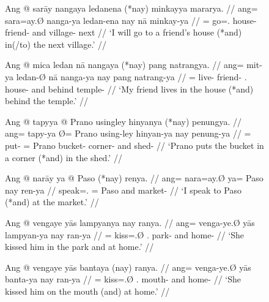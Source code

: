 \begin{figure}
\pex\label{ex:multiplace}
\a\label{ex:multiplace_1}\begingl
	\gla Ang @ sarāy nangaya ledanena \textup{(}*nay\textup{)} minkayya
		mararya. //
	\glb ang= sara=ay.Ø nanga-ya ledan-ena nay nā minkay-ya //
	\glc \AgtT{}= go=\Fsg{}.\Top{} house-\Loc{} friend-\Gen{} and
		village-\Loc{} next //
	\glft `I will go to a friend's house (*and) in(/to) the next village.' //
\endgl

\a\label{ex:multiplace_2}\begingl
	\gla Ang @ mica ledan nā nangaya \textup{(}*nay\textup{)} pang 
		natrangya. //
	\glb ang= mit-ya ledan-Ø nā nanga-ya nay pang natrang-ya //
	\glc \AgtT{}= live-\TsgM{} friend-\Top{} \Fsg{}.\Gen{} house-\Loc{} and
		behind temple-\Loc{} //
	\glft `My friend lives in the house (*and) behind the temple.' //
\endgl

\a\label{ex:multiplace_3}\begingl
	\gla Ang @ tapyya {} @ Prano usingley hinyanya \textup{(}*nay\textup{)}
		penungya. //
	\glb ang= tapy-ya Ø= Prano using-ley hinyan-ya nay penung-ya //
	\glc \AgtT{}= put-\TsgM{} \Top{}= Prano bucket-\PargI{} corner-\Loc{}
		and shed-\Loc {} //
	\glft `Prano puts the bucket in a corner (*and) in the shed.' //
\endgl

\a\label{ex:multiplace_4}\begingl
	\gla Ang @ narāy ya @ Paso \textup{(}*nay\textup{)} renya. //
	\glb ang= nara=ay.Ø ya= Paso nay ren-ya //
	\glc \AgtT{} speak=\Fsg{}.\Top{} \Loc{}= Paso and market-\Loc{} //
	\glft `I speak to Paso (*and) at the market.' //
\endgl
\xe
\end{figure}

\begin{figure}[h]
\pex\label{ex:multiplace_5}%
\a\label{ex:multiplace_5_1}%
\begingl
	\gla Ang @ vengaye yās lampyanya nay ranya. //
	\glb ang= venga-ye.Ø yās lampyan-ya nay ran-ya //
	\glc \AgtT{}= kiss=\TsgF{}.Ø \TsgM{}.\Parg{} park-\Loc{} and home-\Loc{} //
	\glft `She kissed him in the park and at home.' //
\endgl

\a\label{ex:multiplace_5_2}%
\begingl
	\gla Ang @ vengaye yās bantaya \textup{(\excl{}}nay\textup{)} ranya. //
	\glb ang= venga-ye.Ø yās banta-ya nay ran-ya //
	\glc \AgtT{}= kiss=\TsgF{}.Ø \TsgM{}.\Parg{} mouth-\Loc{} and 
		home-\Loc{}	//
	\glft `She kissed him on the mouth (\excl{}and) at home.' //
\endgl
\xe
\end{figure}

